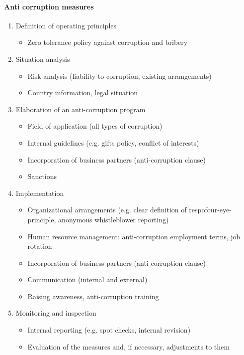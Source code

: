 \paragraph{Anti corruption measures}
\begin{enumerate}
	\item Definition of operating principles
	\begin{itemize}
		\tightlist
		\item Zero tolerance policy against corruption and bribery
	\end{itemize}
	\item Situation analysis
	\begin{itemize}
		\tightlist
		\item Risk analysis (liability to corruption, existing arrangements)
		\item Country information, legal situation
	\end{itemize}
	\item Elaboration of an anti-corruption program
	\begin{itemize}
		\tightlist
		\item Field of application (all types of corruption)
		\item Internal guidelines (e.g. gifts policy, conflict of interests)
		\item Incorporation of business partners (anti-corruption clause)
		\item Sanctions
	\end{itemize}
	\item Implementation
	\begin{itemize}
		\tightlist
		\item Organizational arrangements (e.g. clear definition of respofour-eye-principle, anonymous whistleblower reporting)		
		\item Human resource management: anti-corruption employment terms, job rotation
		\item Incorporation of business partners (anti-corruption clause)
		\item Communication (internal and external)
		\item Raising awareness, anti-corruption training	
	\end{itemize}
	\item Monitoring and inspection
	\begin{itemize}
		\tightlist
		\item Internal reporting (e.g. spot checks, internal revision)	
		\item Evaluation of the measures and, if necessary, adjustments to them
	\end{itemize}
\end{enumerate}
